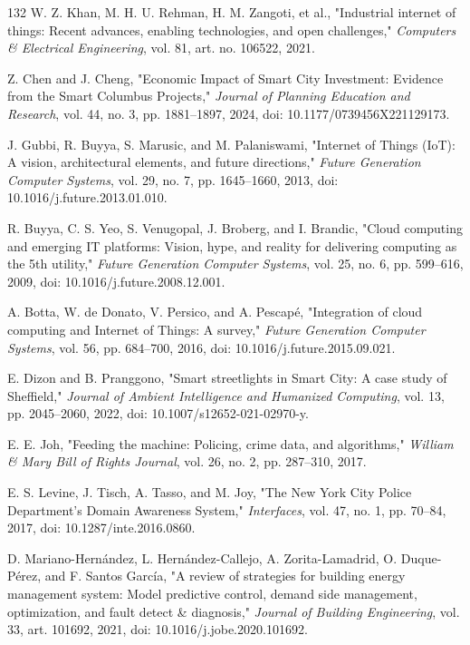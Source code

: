 \documentclass[pdflatex,sn-mathphys-num]{sn-jnl}%
\theoremstyle{thmstyleone}%
\theoremstyle{thmstyletwo}%
\theoremstyle{thmstylethree}%
\begin{document}
\begin{thebibliography}{132}
 W. Z. Khan, M. H. U. Rehman, H. M. Zangoti, et al., "Industrial internet of things: Recent advances, enabling technologies, and open challenges," \emph{Computers \& Electrical Engineering}, vol. 81, art. no. 106522, 2021.

 Z. Chen and J. Cheng, "Economic Impact of Smart City Investment: Evidence from the Smart Columbus Projects," \emph{Journal of Planning Education and Research}, vol. 44, no. 3, pp. 1881--1897, 2024, doi: 10.1177/0739456X221129173.

 J. Gubbi, R. Buyya, S. Marusic, and M. Palaniswami, "Internet of Things (IoT): A vision, architectural elements, and future directions," \emph{Future Generation Computer Systems}, vol. 29, no. 7, pp. 1645--1660, 2013, doi: 10.1016/j.future.2013.01.010.

 R. Buyya, C. S. Yeo, S. Venugopal, J. Broberg, and I. Brandic, "Cloud computing and emerging IT platforms: Vision, hype, and reality for delivering computing as the 5th utility," \emph{Future Generation Computer Systems}, vol. 25, no. 6, pp. 599--616, 2009, doi: 10.1016/j.future.2008.12.001.

 A. Botta, W. de Donato, V. Persico, and A. Pescap\'e, "Integration of cloud computing and Internet of Things: A survey," \emph{Future Generation Computer Systems}, vol. 56, pp. 684--700, 2016, doi: 10.1016/j.future.2015.09.021.

 E. Dizon and B. Pranggono, "Smart streetlights in Smart City: A case study of Sheffield," \emph{Journal of Ambient Intelligence and Humanized Computing}, vol. 13, pp. 2045--2060, 2022, doi: 10.1007/s12652-021-02970-y.

 E. E. Joh, "Feeding the machine: Policing, crime data, and algorithms," \emph{William \& Mary Bill of Rights Journal}, vol. 26, no. 2, pp. 287--310, 2017.

 E. S. Levine, J. Tisch, A. Tasso, and M. Joy, "The New York City Police Department's Domain Awareness System," \emph{Interfaces}, vol. 47, no. 1, pp. 70--84, 2017, doi: 10.1287/inte.2016.0860.

 D. Mariano-Hern\'andez, L. Hern\'andez-Callejo, A. Zorita-Lamadrid, O. Duque-P\'erez, and F. Santos Garc\'ia, "A review of strategies for building energy management system: Model predictive control, demand side management, optimization, and fault detect \& diagnosis," \emph{Journal of Building Engineering}, vol. 33, art. 101692, 2021, doi: 10.1016/j.jobe.2020.101692.


\end{thebibliography}
\end{document}
